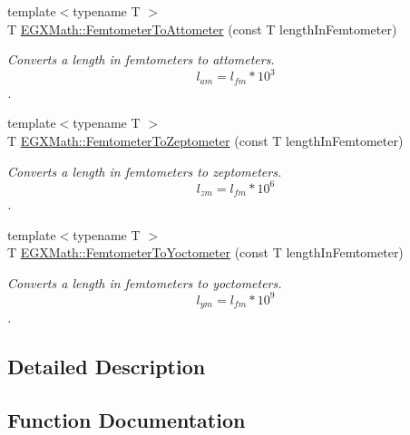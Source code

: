 \begin{DoxyCompactItemize}
{\footnotesize template$<$typename T $>$ }\\T \mbox{\hyperlink{group___e_g_x_math-_conversions-_length_conversions-_s_i-_femtometer-_s_i_ga62157df6cfd3d6b801c521105b7f4f71}{E\+G\+X\+Math\+::\+Femtometer\+To\+Attometer}} (const T length\+In\+Femtometer)
\begin{DoxyCompactList}\small\item\em Converts a length in femtometers to attometers. \[ l_{am}=l_{fm} * 10^{3} \]. \end{DoxyCompactList}\item 
{\footnotesize template$<$typename T $>$ }\\T \mbox{\hyperlink{group___e_g_x_math-_conversions-_length_conversions-_s_i-_femtometer-_s_i_ga9bcc5cf611f6646652effc080ce29f1a}{E\+G\+X\+Math\+::\+Femtometer\+To\+Zeptometer}} (const T length\+In\+Femtometer)
\begin{DoxyCompactList}\small\item\em Converts a length in femtometers to zeptometers. \[ l_{zm}=l_{fm} * 10^{6} \]. \end{DoxyCompactList}\item 
{\footnotesize template$<$typename T $>$ }\\T \mbox{\hyperlink{group___e_g_x_math-_conversions-_length_conversions-_s_i-_femtometer-_s_i_ga6406395140da34327a85098a7dd9e4f0}{E\+G\+X\+Math\+::\+Femtometer\+To\+Yoctometer}} (const T length\+In\+Femtometer)
\begin{DoxyCompactList}\small\item\em Converts a length in femtometers to yoctometers. \[ l_{ym}=l_{fm} * 10^{9} \]. \end{DoxyCompactList}\end{DoxyCompactItemize}


\subsection{Detailed Description}


\subsection{Function Documentation}
\mbox{\label{group___e_g_x_math-_conversions-_length_conversions-_s_i-_femtometer-_s_i_ga62157df6cfd3d6b801c521105b7f4f71}} 
